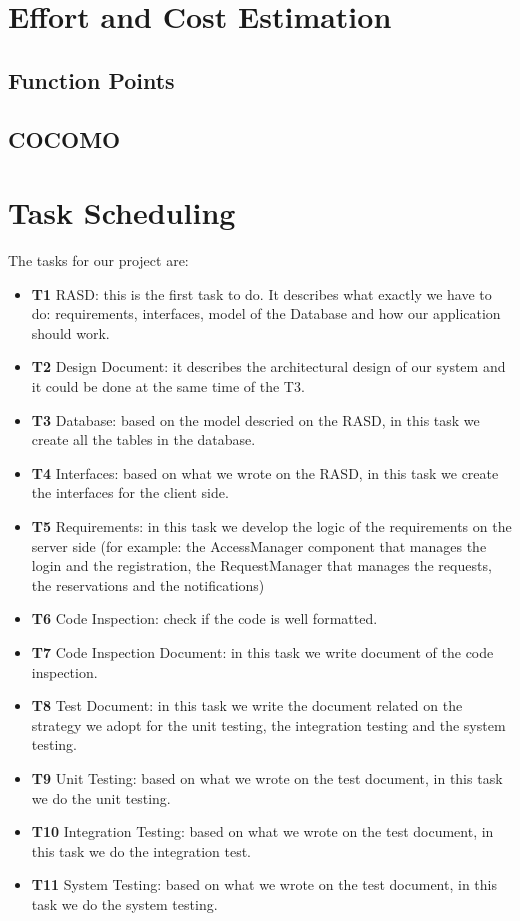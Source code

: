 \documentclass[18pt,oneside,a4paper, titlepage]{article}
\begin{document}
\newpage
\section{Effort and Cost Estimation}

	\subsection{Function Points}
	\subsection{COCOMO}
	
\newpage
\section{Task Scheduling}
	The tasks for our project are:
	\begin{itemize}
		\item \textbf{T1} RASD: this is the first task to do. It describes what exactly we have to do: requirements, interfaces, model of the Database and how our application should work.
		\item \textbf{T2} Design Document: it describes the architectural design of our system and it could be done at the same time of the T3.
		\item \textbf{T3} Database: based on the model descried on the RASD, in this task we create all the tables in the database.
		\item \textbf{T4} Interfaces: based on what we wrote on the RASD, in this task we create the interfaces for the client side.
		\item \textbf{T5} Requirements: in this task we develop the logic of the requirements on the server side (for example: the AccessManager component that manages the login and the registration, the RequestManager that manages the requests, the reservations and the notifications)
		\item \textbf{T6} Code Inspection: check if the code is well formatted.
		\item \textbf{T7} Code Inspection Document: in this task we write document of the code inspection.
		\item \textbf{T8} Test Document: in this task we write the document related on the strategy we adopt for the unit testing, the integration testing and the system testing.
		\item \textbf{T9} Unit Testing: based on what we wrote on the  test document, in this task we do the unit testing.
		\item \textbf{T10} Integration Testing: based on what we wrote on the test document, in this task we do the integration test.
		\item \textbf{T11} System Testing: based on what we wrote on the  test document, in this task we do the system testing.
	\end{itemize}
\end{document}
